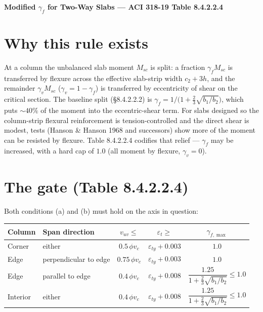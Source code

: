 \documentclass[10pt]{article}
\begin{document}
\begin{center}{\large\bfseries Modified $\gamma_f$ for Two-Way Slabs --- ACI 318-19 Table 8.4.2.2.4}\end{center}

\section*{Why this rule exists}
At a column the unbalanced slab moment $M_{sc}$ is split: a fraction $\gamma_f M_{sc}$ is transferred by flexure across the effective slab-strip width $c_2 + 3h$, and the remainder $\gamma_v M_{sc}$ ($\gamma_v = 1-\gamma_f$) is transferred by eccentricity of shear on the critical section. The baseline split (\S 8.4.2.2.2) is
$\gamma_f = 1 / \bigl(1 + \tfrac{2}{3}\sqrt{b_1/b_2}\bigr)$, which puts ${\sim}40\%$ of the moment into the eccentric-shear term. For slabs designed so the column-strip flexural reinforcement is tension-controlled and the direct shear is modest, tests (Hanson \& Hanson 1968 and successors) show more of the moment can be resisted by flexure. Table 8.4.2.2.4 codifies that relief --- $\gamma_f$ may be increased, with a hard cap of $1.0$ (all moment by flexure, $\gamma_v = 0$).

\section*{The gate (Table 8.4.2.2.4)}

Both conditions (a) and (b) must hold on the axis in question:

\begin{tabular}{|l|l|c|c|c|}
\hline
\textbf{Column} & \textbf{Span direction} & $v_{uv} \leq$ & $\varepsilon_t \geq$ & $\gamma_{f,\max}$ \\
\hline
Corner          & either                   & $0.5\,\phi v_c$   & $\varepsilon_{ty} + 0.003$ & $1.0$ \\
Edge            & perpendicular to edge    & $0.75\,\phi v_c$  & $\varepsilon_{ty} + 0.003$ & $1.0$ \\
Edge            & parallel to edge         & $0.4\,\phi v_c$   & $\varepsilon_{ty} + 0.008$ & $\dfrac{1.25}{1 + \tfrac{2}{3}\sqrt{b_1/b_2}} \leq 1.0$ \\
Interior        & either                   & $0.4\,\phi v_c$   & $\varepsilon_{ty} + 0.008$ & $\dfrac{1.25}{1 + \tfrac{2}{3}\sqrt{b_1/b_2}} \leq 1.0$ \\
\hline
\end{tabular}
\end{document}
